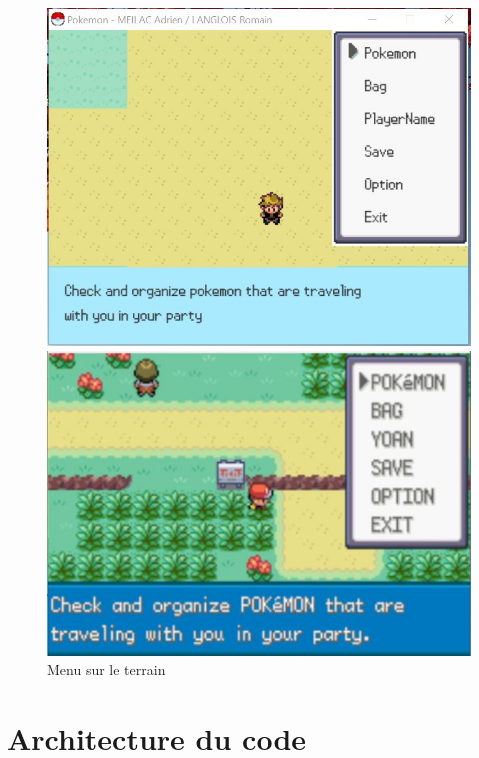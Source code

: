 \documentclass[a4paper,twoside, openany,11pt]{book}
\begin{document}
\begin{figure}[!h]
\begin{minipage}{0.49\textwidth}
\includegraphics[scale = 0.6]{Images/fieldMenu.jpg}
\end{minipage}
\begin{minipage}{0.49\textwidth}
\includegraphics[scale = 0.84]{Images/vrai_jeu_fieldMenu.jpg}
\end{minipage}
\caption{Menu sur le terrain}
\end{figure}

\newpage 
\pagestyle{PageNormale}
\section{Architecture du code}
\end{document}
